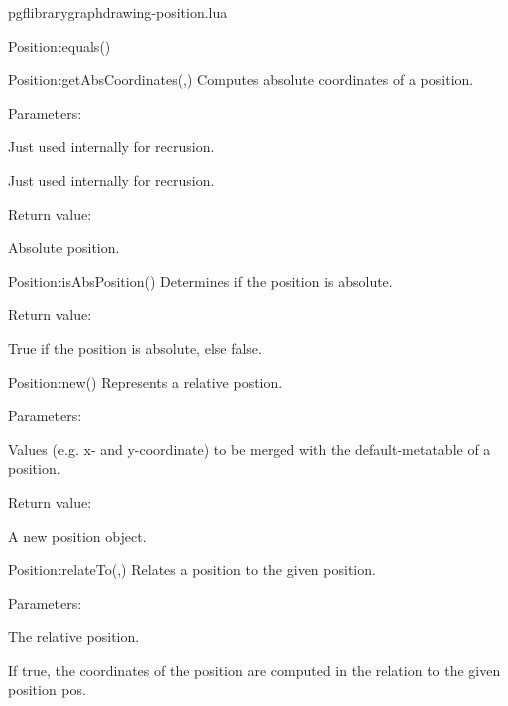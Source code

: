\begin{filedescription}{pgflibrarygraphdrawing-position.lua}
\begin{luacommand}{{Position:equals}()}
\end{luacommand}
\begin{luacommand}{{Position:getAbsCoordinates}(,)}
Computes absolute coordinates of a position.

Parameters:
\begin{parameterdescription}
	\item[\meta{x}] Just used internally for recrusion.\item[\meta{y}] Just used internally for recrusion.
\end{parameterdescription}


Return value:
\begin{parameterdescription} 
  \item[] Absolute position.
\end{parameterdescription}


\end{luacommand}
\begin{luacommand}{{Position:isAbsPosition}()}
Determines if the position is absolute.


Return value:
\begin{parameterdescription} 
  \item[] True if the position is absolute, else false.
\end{parameterdescription}


\end{luacommand}
\begin{luacommand}{{Position:new}()}
Represents a relative postion.

Parameters:
\begin{parameterdescription}
	\item[\meta{values}] Values (e.g. x- and y-coordinate) to be merged with the default-metatable of a position.
\end{parameterdescription}


Return value:
\begin{parameterdescription} 
  \item[] A new position object.
\end{parameterdescription}


\end{luacommand}
\begin{luacommand}{{Position:relateTo}(,)}
Relates a position to the given position.

Parameters:
\begin{parameterdescription}
	\item[\meta{pos}] The relative position.\item[\meta{keepAbsPosition}] If true, the coordinates of the position are computed in the relation to the given position pos.
\end{parameterdescription}



\end{luacommand}

\end{filedescription}